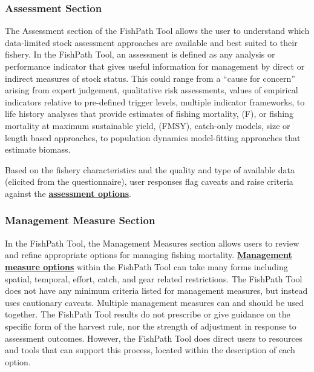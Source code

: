 \documentclass[
  11pt,
]{book}
\begin{document}
\hypertarget{assessment-section}{%
\subsubsection{Assessment Section}\label{assessment-section}}

The Assessment section of the FishPath Tool allows the user to understand which data-limited stock assessment approaches are available and best suited to their fishery. In the FishPath Tool, an assessment is defined as any analysis or performance indicator that gives useful information for management by direct or indirect measures of stock status. This could range from a ``cause for concern'' arising from expert judgement, qualitative risk assessments, values of empirical indicators relative to pre-defined trigger levels, multiple indicator frameworks, to life history analyses that provide estimates of fishing mortality, (F), or fishing mortality at maximum sustainable yield, (FMSY), catch-only models, size or length based approaches, to population dynamics model-fitting approaches that estimate biomass.

Based on the fishery characteristics and the quality and type of available data (elicited from the questionnaire), user responses flag caveats and raise criteria against the \protect\hyperlink{assessment-categories}{\textbf{assessment options}}.

\hypertarget{management-measure-section}{%
\subsubsection{Management Measure Section}\label{management-measure-section}}

In the FishPath Tool, the Management Measures section allows users to review and refine appropriate options for managing fishing mortality. \protect\hyperlink{management-measure-categories}{\textbf{Management measure options}} within the FishPath Tool can take many forms including spatial, temporal, effort, catch, and gear related restrictions. The FishPath Tool does not have any minimum criteria listed for management measures, but instead uses cautionary caveats. Multiple management measures can and should be used together. The FishPath Tool results do not prescribe or give guidance on the specific form of the harvest rule, nor the strength of adjustment in response to assessment outcomes. However, the FishPath Tool does direct users to resources and tools that can support this process, located within the description of each option.
\end{document}
